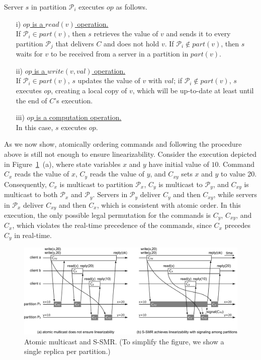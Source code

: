 \documentclass[11pt]{article}
\newcommand{\ppm}{\mathcal{P}}
\begin{document}
Server $s$ in partition $\ppm_i$ executes $op$ as follows.

\begin{itemize}

\item[i)] \underline{$op$ is a $read(v)$ operation.} \\
If $\ppm_i \in part(v)$, then $s$ retrieves the value of $v$ and sends it to every partition $\ppm_j$ that delivers $C$ and does not hold $v$. If $\ppm_i \not\in part(v)$, then $s$ waits for $v$ to be received from a server in a partition in $part(v)$.

\item[ii)] \underline{$op$ is a $write(v,val)$ operation.} \\
If $\ppm_i \in part(v)$, $s$ updates the value of $v$ with $val$; if $\ppm_i \not\in part(v)$, $s$ executes $op$, creating a local copy of $v$, which will be up-to-date at least until the end of $C$'s execution.

\item[iii)] \underline{$op$ is a computation operation.}\\
In this case, $s$ executes $op$.

\end{itemize}


As we now show, atomically ordering commands and following the procedure above is still not enough to ensure linearizability.
Consider the execution depicted in Figure~\ref{fig:mcastnonlinssmr}~(a), where state variables $x$ and $y$ have initial value of $10$.
Command $C_x$ reads the value of $x$, $C_y$ reads the value of $y$, and $C_{xy}$ sets $x$ and $y$ to value 20.
Consequently, $C_x$ is multicast to partition $\ppm_x$, $C_y$ is multicast to $\ppm_y$, and $C_{xy}$ is multicast to both $\ppm_x$ and $\ppm_y$.
Servers in $\ppm_y$ deliver $C_y$ and then $C_{xy}$, while servers in $\ppm_x$ deliver $C_{xy}$ and then $C_x$, which is consistent with atomic order.
In this execution, the only possible legal permutation for the commands is $C_y$, $C_{xy}$, and $C_x$, which violates the real-time precedence of the commands, since $C_x$ precedes $C_y$ in real-time.

\begin{figure}
\begin{minipage}[b]{1.0\linewidth} %
\centering
      \includegraphics[width=0.85\linewidth]{mcastssmr_nonlin_linsignal_v3}
\end{minipage}
\caption{Atomic multicast and S-SMR. (To simplify the figure, we show a single replica per partition.)}
\label{fig:mcastnonlinssmr}
\end{figure}
\end{document}
